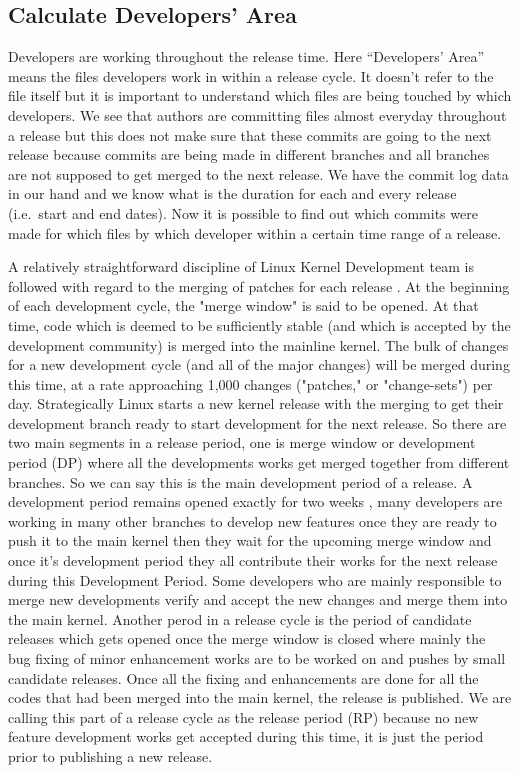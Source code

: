 \documentclass{acm_proc_article-sp}
\begin{document}
\subsection{Calculate Developers' Area}
Developers are working throughout the release time. Here ``Developers' Area'' means the files developers work in within a release cycle. It doesn't refer to the file itself but it is important to understand which files are being touched by which developers. We see that authors are committing files almost everyday throughout a release but this does not make sure that these commits are going to the next release because commits are being made in different branches and all branches are not supposed to get merged to the next release. We have the commit log data in our hand and we know what is the duration for each and every release (i.e.\ start and end dates). Now it is possible to find out which commits were made for which files by which developer within a certain time range of a release.

A relatively straightforward discipline of Linux Kernel Development team is followed with regard to the merging of patches for each release \cite{linux_kernel}. At the beginning of each development cycle, the "merge window" is said to be opened. At that time, code which is deemed to be sufficiently stable (and which is accepted by the development community) is merged into the mainline kernel. The bulk of changes for a new development cycle (and all of the major changes) will be merged during this time, at a rate approaching 1,000 changes ("patches," or "change-sets") per day. Strategically Linux starts a new kernel release with the merging to get their development branch ready to start development for the next release. So there are two main segments in a release period, one is merge window or development period (DP) where all the developments works get merged together from different branches. So we can say this is the main development period of a release. A development period remains opened exactly for two weeks \cite{linux_kernel}, many developers are working in many other branches to develop new features once they are ready to push it to the main kernel then they wait for the upcoming merge window and once it's development period they all contribute their works for the next release during this Development Period. Some developers who are mainly responsible to merge new developments verify and accept the new changes and merge them into the main kernel. Another perod in a release cycle is the period of candidate releases which gets opened once the merge window is closed where mainly the bug fixing of minor enhancement works are to be worked on and pushes by small candidate releases. Once all the fixing and enhancements are done for all the codes that had been merged into the main kernel, the release is published. We are calling this part of a release cycle as the release period (RP) because no new feature development works get accepted during this time, it is just the period prior to publishing a new release.
\end{document}
